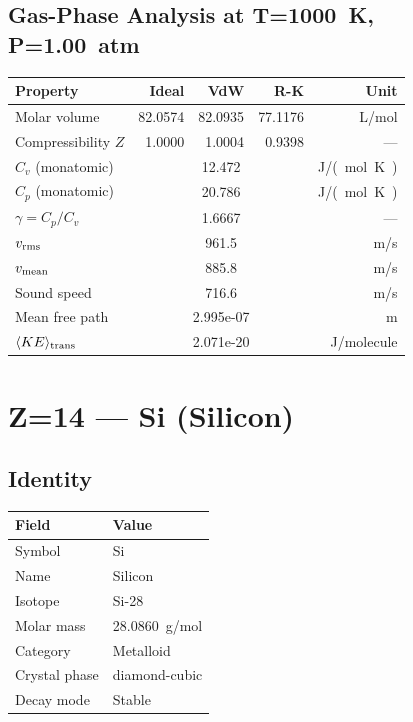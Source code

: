 \documentclass[11pt,a4paper]{article}
\begin{document}
\subsection{Gas-Phase Analysis at T=\SI{1000}{K}, P=\SI{1.00}{atm}}
\begin{tabular}{lrrrr}
  \toprule
  Property & Ideal & VdW & R-K & Unit \\
  \midrule
  Molar volume & 82.0574 & 82.0935 & 77.1176 & \si{L/mol} \\
  Compressibility $Z$ & 1.0000 & 1.0004 & 0.9398 & --- \\
  \midrule
  $C_v$ (monatomic) & \multicolumn{3}{c}{12.472} & \si{J/(mol.K)} \\
  $C_p$ (monatomic) & \multicolumn{3}{c}{20.786} & \si{J/(mol.K)} \\
  $\gamma = C_p/C_v$ & \multicolumn{3}{c}{1.6667} & --- \\
  $v_{\rm rms}$ & \multicolumn{3}{c}{961.5} & \si{m/s} \\
  $v_{\rm mean}$ & \multicolumn{3}{c}{885.8} & \si{m/s} \\
  Sound speed & \multicolumn{3}{c}{716.6} & \si{m/s} \\
  Mean free path & \multicolumn{3}{c}{2.995e-07} & \si{m} \\
  $\langle KE \rangle_{\rm trans}$ & \multicolumn{3}{c}{2.071e-20} & \si{J/molecule} \\
  \bottomrule
\end{tabular}

\newpage

\section{Z=14 --- Si (Silicon)}
\label{sec:Z14}

\subsection{Identity}
\begin{tabular}{ll}
  \toprule
  Field & Value \\
  \midrule
  Symbol & Si \\
  Name & Silicon \\
  Isotope & Si-28 \\
  Molar mass & \SI{28.0860}{g/mol} \\
  Category & Metalloid \\
  Crystal phase & diamond-cubic \\
  Decay mode & Stable \\
  \bottomrule
\end{tabular}
\end{document}

